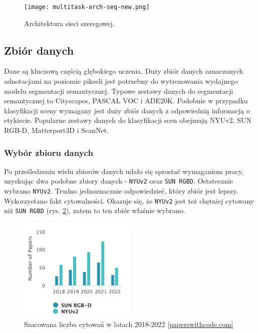 \begin{figure}[ht!]
    \centering
    \texttt{[image: multitask-arch-seq-new.png]}
    \caption{Architektura sieci szeregowej.}
    \label{fig:multitask-seq}
\end{figure}



\subsection{Zbiór  danych}
Dane są kluczową częścią głębokiego uczenia. Duży zbiór danych oznaczonych adnotacjami na poziomie pikseli jest potrzebny do wytrenowania wydajnego modelu segmentacji semantycznej. Typowe zestawy danych do segmentacji semantycznej to Cityscapes, PASCAL VOC i ADE20K. Podobnie w przypadku klasyfikacji sceny wymagany jest duży zbiór danych z odpowiednią informacją o etykiecie. Popularne zestawy danych do klasyfikacji scen obejmują NYUv2, SUN RGB-D, Matterport3D i ScanNet.
\subsubsection{Wybór zbioru danych}
Po prześledzeniu wielu zbiorów danych udało się sprostać wymaganiom pracy, uzyskując dwa podobne zbiory danych - \texttt{NYUv2} oraz \texttt{SUN RGBD}. Ostatecznie wybrano \texttt{NYUv2}. Trudno jednoznacznie odpowiedzieć, który zbiór jest lepszy. Wykorzystano fakt cytowalności. Okazuje się, że \texttt{NYUv2} jest też chętniej cytowany niż \texttt{SUN RGBD} (rys. \ref{fig:sun-vs-nyu}), zatem to ten zbiór właśnie wybrano.

\begin{figure}[ht!]
    \centering
    \includegraphics[width=0.5\textwidth]{img/stats-dataset.png}
    \caption[]{Szacowana liczba cytowań w latach 2018-2022 \href{https://paperswithcode.com/dataset/sun-rgb-d}{[paperswithcode.com]}}
    \label{fig:sun-vs-nyu}
\end{figure}
